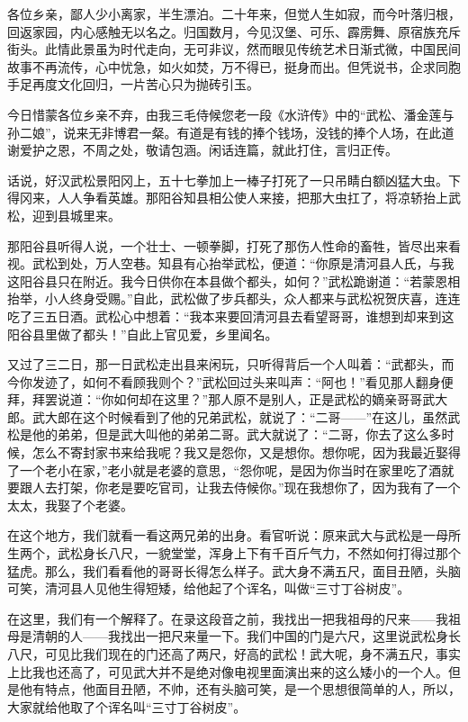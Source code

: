 \par 各位乡亲，鄙人少小离家，半生漂泊。二十年来，但觉人生如寂，而今叶落归根，回返家园，内心感触无以名之。归国数月，今见汉堡、可乐、霹雳舞、原宿族充斥街头。此情此景虽为时代走向，无可非议，然而眼见传统艺术日渐式微，中国民间故事不再流传，心中忧急，如火如焚，万不得已，挺身而出。但凭说书，企求同胞手足再度文化回归，一片苦心只为抛砖引玉。
\par 今日惜蒙各位乡亲不弃，由我三毛侍候您老一段《水浒传》中的“武松、潘金莲与孙二娘”，说来无非博君一粲。有道是有钱的捧个钱场，没钱的捧个人场，在此道谢爱护之恩，不周之处，敬请包涵。闲话连篇，就此打住，言归正传。
\par 话说，好汉武松景阳冈上，五十七拳加上一棒子打死了一只吊睛白额凶猛大虫。下得冈来，人人争看英雄。那阳谷知县相公使人来接，把那大虫扛了，将凉轿抬上武松，迎到县城里来。
\par 那阳谷县听得人说，一个壮士、一顿拳脚，打死了那伤人性命的畜牲，皆尽出来看视。武松到处，万人空巷。知县有心抬举武松，便道：“你原是清河县人氏，与我这阳谷县只在附近。我今日供你在本县做个都头，如何？”武松跪谢道：“若蒙恩相抬举，小人终身受赐。”自此，武松做了步兵都头，众人都来与武松祝贺庆喜，连连吃了三五日酒。武松心中想着：“我本来要回清河县去看望哥哥，谁想到却来到这阳谷县里做了都头！”自此上官见爱，乡里闻名。
\par 又过了三二日，那一日武松走出县来闲玩，只听得背后一个人叫着：“武都头，而今你发迹了，如何不看顾我则个？”武松回过头来叫声：“阿也！”看见那人翻身便拜，拜罢说道：“你如何却在这里？”那人原不是别人，正是武松的嫡亲哥哥武大郎。武大郎在这个时候看到了他的兄弟武松，就说了：“二哥——”在这儿，虽然武松是他的弟弟，但是武大叫他的弟弟二哥。武大就说了：“二哥，你去了这么多时候，怎么不寄封家书来给我呢？我又是怨你，又是想你。想你呢，因为我最近娶得了一个老小在家，”老小就是老婆的意思，“怨你呢，是因为你当时在家里吃了酒就要跟人去打架，你老是要吃官司，让我去侍候你。”现在我想你了，因为我有了一个太太，我娶了个老婆。
\par 在这个地方，我们就看一看这两兄弟的出身。看官听说：原来武大与武松是一母所生两个，武松身长八尺，一貌堂堂，浑身上下有千百斤气力，不然如何打得过那个猛虎。那么，我们看看他的哥哥长得怎么样子。武大身不满五尺，面目丑陋，头脑可笑，清河县人见他生得短矮，给他起了个诨名，叫做“三寸丁谷树皮”。
\par 在这里，我们有一个解释了。在录这段音之前，我找出一把我祖母的尺来——我祖母是清朝的人——我找出一把尺来量一下。我们中国的门是六尺，这里说武松身长八尺，可见比我们现在的门还高了两尺，好高的武松！武大呢，身不满五尺，事实上比我也还高了，可见武大并不是绝对像电视里面演出来的这么矮小的一个人。但是他有特点，他面目丑陋，不帅，还有头脑可笑，是一个思想很简单的人，所以，大家就给他取了个诨名叫“三寸丁谷树皮”。
